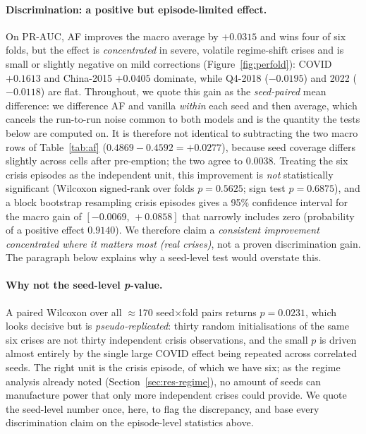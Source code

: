 \documentclass[11pt,a4paper]{article}
\newcommand{\prauc}{\mbox{PR-AUC}}
\begin{document}
\paragraph{Discrimination: a positive but episode-limited effect.} On
$\prauc$, AF improves the macro average by $+0.0315$ and wins four of six
folds, but the effect is \emph{concentrated} in severe, volatile regime-shift
crises and is small or slightly negative on mild corrections
(Figure~\ref{fig:perfold}): COVID $+0.1613$ and China-2015 $+0.0405$ dominate,
while Q4-2018 ($-0.0195$) and 2022 ($-0.0118$) are flat. Throughout, we quote this
gain as the \emph{seed-paired} mean difference: we difference AF and vanilla
\emph{within} each seed and then average, which cancels the run-to-run noise
common to both models and is the quantity the tests below are computed on. It
is therefore not identical to subtracting the two macro rows of
Table~\ref{tab:af} ($0.4869-0.4592=+0.0277$), because seed coverage differs
slightly across cells after pre-emption; the two agree to $0.0038$. Treating
the six crisis episodes as the independent unit, this improvement is
\emph{not} statistically significant (Wilcoxon signed-rank over folds
$p=0.5625$; sign test $p=0.6875$), and a block bootstrap resampling crisis
episodes gives a 95\% confidence interval for the macro gain of
$[-0.0069,\,+0.0858]$ that narrowly includes zero (probability of a positive
effect $0.9140$). We therefore claim a \emph{consistent improvement concentrated
where it matters most (real crises)}, not a proven discrimination gain. The
paragraph below explains why a seed-level test would overstate this.

\paragraph{Why not the seed-level \emph{p}-value.}
A paired Wilcoxon over all $\approx$170 seed$\times$fold pairs returns
$p=0.0231$, which looks decisive but is \emph{pseudo-replicated}: thirty random
initialisations of the same six crises are not thirty independent crisis
observations, and the small $p$ is driven almost entirely by the single large
COVID effect being repeated across correlated seeds. The right unit is the
crisis episode, of which we have six; as the regime analysis already noted
(Section~\ref{sec:res-regime}), no amount of seeds can manufacture power that
only more independent crises could provide. We quote the seed-level number
once, here, to flag the discrepancy, and base every discrimination claim on the
episode-level statistics above.
\end{document}
